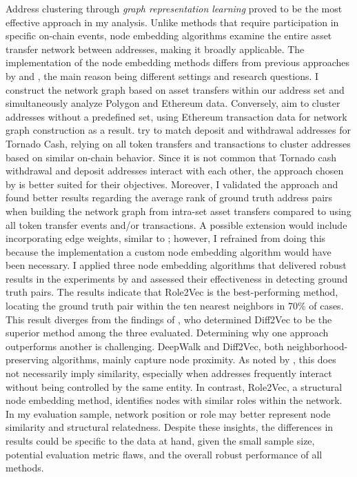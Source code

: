 \documentclass[12pt,a4paper,titlepage,oneside,english]{article}
\begin{document}
Address clustering through \textit{graph representation learning} proved to be the most effective approach in my analysis. Unlike methods that require participation in specific on-chain events, node embedding algorithms examine the entire asset transfer network between addresses, making it broadly applicable. \newline
The implementation of the node embedding methods differs from previous approaches by \cite{Beres2020} and \cite{wu2022tutela}, the main reason being different settings and research questions. I construct the network graph based on asset transfers within our address set and simultaneously analyze Polygon and Ethereum data. \newline
Conversely, \cite{wu2022tutela} aim to cluster addresses without a predefined set, using Ethereum transaction data for network graph construction as a result. \cite{Beres2020} try to match deposit and withdrawal addresses for Tornado Cash, relying on all token transfers and transactions to cluster addresses based on similar on-chain behavior. Since it is not common that Tornado cash withdrawal and deposit addresses interact with each other, the approach chosen by \cite{Beres2020} is better suited for their objectives. \newline
Moreover, I validated the approach and found better results regarding the average rank of ground truth address pairs when building the network graph from intra-set asset transfers compared to using all token transfer events and/or transactions. A possible extension would include incorporating edge weights, similar to \cite{wu2022tutela}; however, I refrained from doing this because the implementation a custom node embedding algorithm would have been necessary.\newline
I applied three node embedding algorithms that delivered robust results in the experiments by \cite{Beres2020} and assessed their effectiveness in detecting ground truth pairs. The results indicate that Role2Vec is the best-performing method, locating the ground truth pair within the ten nearest neighbors in 70\% of cases.  This result diverges from the findings of \cite{Beres2020}, who determined Diff2Vec to be the superior method among the three evaluated. \newline
Determining why one approach outperforms another is challenging. DeepWalk and Diff2Vec, both neighborhood-preserving algorithms, mainly capture node proximity. As noted by \cite{ahmed2018roletovec}, this does not necessarily imply similarity, especially when addresses frequently interact without being controlled by the same entity. In contrast, Role2Vec, a structural node embedding method, identifies nodes with similar roles within the network. In my evaluation sample, network position or role may better represent node similarity and structural relatedness. Despite these insights, the differences in results could be specific to the data at hand, given the small sample size, potential evaluation metric flaws, and the overall robust performance of all methods. \newline 
\end{document}
